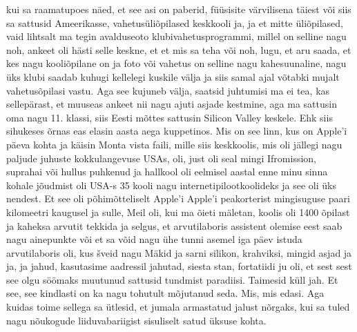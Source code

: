 kui sa raamatupoes näed, et see asi on paberid, füüsisite värvilisena täiest või siis sa sattusid Ameerikasse, vahetusüliõpilased keskkooli ja, ja et mitte üliõpilased, vaid lihtsalt ma tegin avalduseoto klubivahetusprogrammi, millel on selline nagu noh, ankeet oli hästi selle keskne, et et mis sa teha või noh, lugu, et aru saada, et kes nagu kooliõpilane on ja foto või vahetus on selline nagu kahesuunaline, nagu üks klubi saadab kuhugi kellelegi kuskile välja ja siis samal ajal võtabki mujalt vahetusõpilasi vastu. Aga see kujuneb välja, saatsid juhtumisi ma ei tea, kas sellepärast, et muuseas ankeet nii nagu ajuti asjade kestmine, aga ma sattusin oma nagu 11. klassi, siis Eesti mõttes sattusin Silicon Valley keskele. Ehk siis sihukeses õrnas eas elasin aasta aega kuppetinos. Mis on see linn, kus on Apple'i päeva kohta ja käisin Monta vista faili, mille siis keskkoolis, mis oli jällegi nagu paljude juhuste kokkulangevuse USAs, oli, just oli seal mingi Ifromission, suprahai või hullus puhkenud ja hallkool oli eelmisel aastal enne minu sinna kohale jõudmist oli USA-s 35 kooli nagu internetipilootkoolideks ja see oli üks nendest. Et see oli põhimõtteliselt Apple'i Apple'i peakorterist mingisuguse paari kilomeetri kaugusel ja sulle, Meil oli, kui ma õieti mäletan, koolis oli 1400 õpilast ja kaheksa arvutit tekkida ja selgus, et arvutilaboris assistent olemise eest saab nagu ainepunkte või et sa võid nagu ühe tunni asemel iga päev istuda arvutilaboris oli, kus šveid nagu Mäkid ja sarni silikon, krahviksi, mingid asjad ja ja, ja jahud, kasutasime aadressil jahutad, siesta stan, fortatiidi ju oli, et sest sest see olgu söömaks muutunud sattusid tundmist paradiisi. Taimesid küll jah. Et see, see kindlasti on ka nagu tohutult mõjutanud seda. Mis, mis edasi. Aga kuidas toime sellega sa ütlesid, et jumala armastatud jalust nõrgaks, kui sa tuled nagu nõukogude liiduvabariigist sisuliselt satud üksuse kohta.
